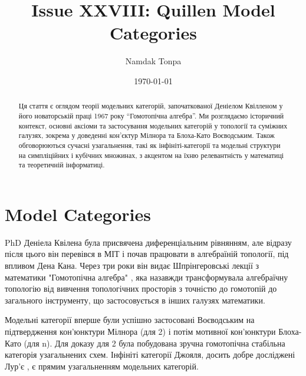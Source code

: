 \documentclass[12pt]{article}
\theoremstyle{plain}
\theoremstyle{definition}
\theoremstyle{remark}
\begin{document}
\title{Issue XXVIII: Quillen Model Categories}
\author{Namdak Tonpa}
\date{\today}

\maketitle

\begin{abstract}
Ця стаття є оглядом теорії модельних категорій, започаткованої Деніелом Квілленом у його новаторській праці 1967 року ``Гомотопічна алгебра''. Ми розглядаємо історичний контекст, основні аксіоми та застосування модельних категорій у топології та суміжних галузях, зокрема у доведенні кон’єктур Мілнора та Блоха-Като Воєводським. Також обговорюються сучасні узагальнення, такі як інфініті-категорії та модельні структури на симпліційних і кубічних множинах, з акцентом на їхню релевантність у математиці та теоретичній інформатиці.
\end{abstract}

\ifincludeTOC
  \tableofcontents
\fi


\section{Model Categories}
PhD Деніела Квілена була присвячена диференціальним рівнянням, але відразу після цього він перевівся в МІТ і почав працювати в алгебраїній топології, під впливом Дена Кана. Через три роки він видає Шпрінгеровські лекції з математики "Гомотопічна алгебра" \cite{Quillen67}, яка назавжди трансформувала алгебраїчну топологію від вивчення топологічних просторів з точністю до гомотопій до загального інструменту, що застосовується в інших галузях математики.

Модельні категорії вперше були успішно застосовані Воєводським на підтвердження кон'юнктури Мілнора \cite{Voevodsky96} (для 2) і потім мотивної кон'юнктури Блоха-Като \cite{Voevodsky03} (для n). Для доказу для 2 була побудована зручна гомотопічна стабільна категорія узагальнених схем. Інфініті категорії Джояля, досить добре досліджені Лур'є \cite{Lurie09}, є прямим узагальненням модельних категорій.
\end{document}
